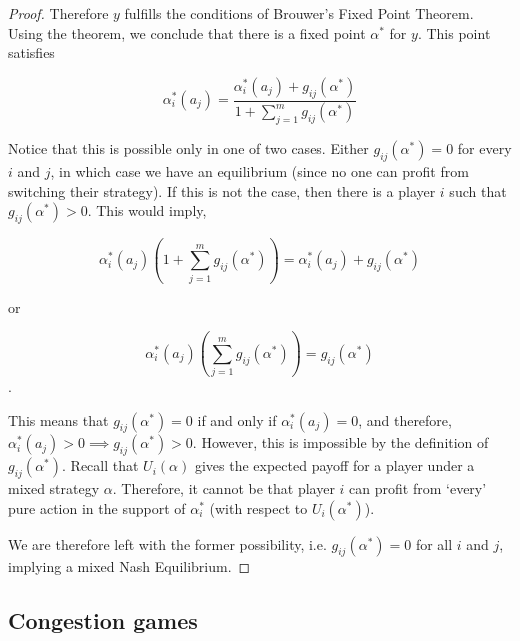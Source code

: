 \documentclass[a4paper,11pt]{article}
\begin{document}
\begin{proof}
Therefore $y$ fulfills the conditions of Brouwer's Fixed Point Theorem. Using the theorem, we conclude that there is a fixed point $\alpha^*$ for $y$. This point satisfies

$$\alpha^*_{i}(a_j) = \frac{\alpha^*_{i}(a_j)+g_{ij}(\alpha^*)}{1+\sum_{j=1}^{m}{g_{ij}(\alpha^*)}}$$

Notice that this is possible only in one of two cases. Either $g_{ij}(\alpha^*)=0$ for every $i$ and $j$, in which case we have an equilibrium (since no one can profit from switching their strategy). If this is not the case, then there is a player $i$ such that $g_{ij}(\alpha^*)>0$. This would imply,

$$\alpha^*_{i}(a_j)\left(1+\sum_{j=1}^{m}{g_{ij}(\alpha^*)}\right) = \alpha^*_{i}(a_j)+g_{ij}(\alpha^*)$$

or

$$\alpha^*_{i}(a_j)\left(\sum_{j=1}^{m}{g_{ij}(\alpha^*)}\right) = g_{ij}(\alpha^*)$$.

This means that $g_{ij}(\alpha^*)=0$ if and only if $\alpha^*_{i}(a_j)=0$, and therefore, $\alpha^*_{i}(a_j)>0 \implies g_{ij}(\alpha^*)>0$. However, this is impossible by the definition of $g_{ij}(\alpha^*)$. Recall that $U_i(\alpha)$ gives the expected payoff for a player under a mixed strategy $\alpha$. Therefore, it cannot be that player $i$ can profit from
`every' pure action in the support of $\alpha^*_i$ (with respect to $U_i(\alpha^*)$).

We are therefore left with the former possibility, i.e. $g_{ij}(\alpha^*)=0$ for all $i$ and $j$, implying a mixed Nash Equilibrium.
\end{proof}


\subsection{Congestion games}
\end{document}

